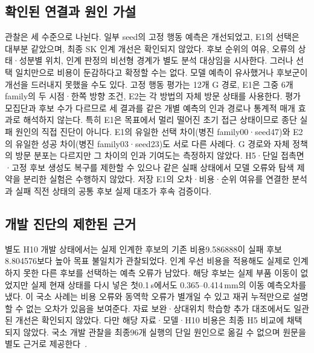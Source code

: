 \documentclass[conference,a4paper]{IEEEtran}
\begin{document}
\subsection{확인된 연결과 원인 가설}
관찰은 세 수준으로 나뉜다.
일부 seed의 고정 행동 예측은 개선되었고, E1의 선택은 대부분 같았으며, 최종 SK 인계 개선은 확인되지 않았다.
후보 순위의 여유, 오류의 상태·성분별 위치, 인계 판정의 비선형 경계가 별도 분석 대상임을 시사한다.
그러나 선택 일치만으로 비용이 둔감하다고 확정할 수는 없다.
모델 예측이 유사했거나 후보군이 개선을 드러내지 못했을 수도 있다.
고정 행동 평가는 12개 G 경로, E1은 그중 6개 family의 두 시점·한쪽 방향 조건, E2는 각 방법의 자체 방문 상태를 사용한다.
평가 모집단과 후보 수가 다르므로 세 결과를 같은 개별 예측의 인과 경로나 통계적 매개 효과로 해석하지 않는다.
특히 E1은 목표에서 멀리 떨어진 초기 접근 상태이므로 종단 실패 원인의 직접 진단이 아니다.
E1의 유일한 선택 차이(병진 family00·seed47)와 E2의 유일한 성공 차이(병진 family03·seed23)도 서로 다른 사례다.
G 경로와 자체 정책의 방문 분포는 다르지만 그 차이의 인과 기여도는 측정하지 않았다.
H5·단일 접촉면·고정 후보 생성도 복구를 제한할 수 있으나 같은 실패 상태에서 모델 오류와 탐색 제약을 분리한 실험은 수행하지 않았다.
저장 E1의 오차·비용·순위 여유를 연결한 분석과 실패 직전 상태의 공통 후보 실제 대조가 후속 검증이다.

\subsection{개발 진단의 제한된 근거}
별도 H10 개발 상태에서는 실제 인계한 후보의 기존 비용9.586888이 실패 후보8.804576보다 높아 목표 불일치가 관찰되었다.
인계 우선 비용을 적용해도 실제로 인계하지 못한 다른 후보를 선택하는 예측 오류가 남았다.
해당 후보는 실제 부품 이동이 없었지만 실제 현재 상태를 다시 넣은 첫0.1\,s에서도 0.365--0.414\,mm의 이동 예측오차를 냈다.
이 국소 사례는 비용 오류와 동역학 오류가 별개일 수 있고 재귀 누적만으로 설명할 수 없는 오차가 있음을 보여준다.
자료 보완·상대위치 학습항 추가 대조에서도 일관된 개선은 확인되지 않았다.
다만 해당 자료·모델·H10 비용은 최종 H5 비교에 채택되지 않았다.
국소 개발 관찰을 최종96개 실행의 단일 원인으로 옮길 수 없으며 원문을 별도 근거로 제공한다~\cite{repository}.
\end{document}
